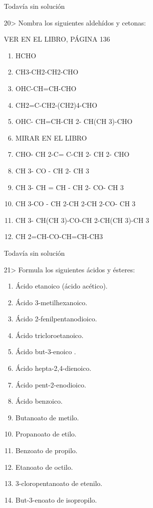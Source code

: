 \documentclass{article}
\begin{document}
\begin{solution}[print=false]
  Todavía sin solución
\end{solution}

\begin{exercise}
  20> Nombra los siguientes aldehídos y cetonas:

  VER EN EL LIBRO, PÁGINA 136
  \begin{enumerate}
    \item HCHO
    \item CH3-CH2-CH2-CHO
    \item OHC-CH=CH-CHO
    \item CH2=C-CH2-(CH2)4-CHO
    \item OHC- CH=CH-CH 2- CH(CH 3)-CHO
    \item MIRAR EN EL LIBRO %
    \item CHO- CH 2-C= C-CH 2- CH 2- CHO
    \item CH 3- CO - CH 2- CH 3
    \item CH 3- CH = CH - CH 2- CO- CH 3
    \item CH 3-CO - CH 2-CH 2-CH 2-CO- CH 3
    \item CH 3- CH(CH 3)-CO-CH 2-CH(CH 3)-CH 3
    \item CH 2=CH-CO-CH=CH-CH3
  \end{enumerate}

\end{exercise}

\begin{solution}[print=false]
  Todavía sin solución
\end{solution}

\begin{exercise}
  21> Formula los siguientes ácidos y ésteres:
  \begin{enumerate}
    \item Ácido etanoico (ácido acético).
    \item Ácido 3-metilhexanoico.
    \item Ácido 2-fenilpentanodioico.
    \item Ácido tricloroetanoico.
    \item Ácido but-3-enoico .
    \item Ácido hepta-2,4-dienoico.
    \item Ácido pent-2-enodioico.
    \item Ácido benzoico.
    \item Butanoato de metilo.
    \item Propanoato de etilo.
    \item Benzoato de propilo.
    \item Etanoato de octilo.
    \item 3-cloropentanoato de etenilo.
    \item But-3-enoato de isopropilo.
  \end{enumerate}
\end{exercise}
\end{document}
